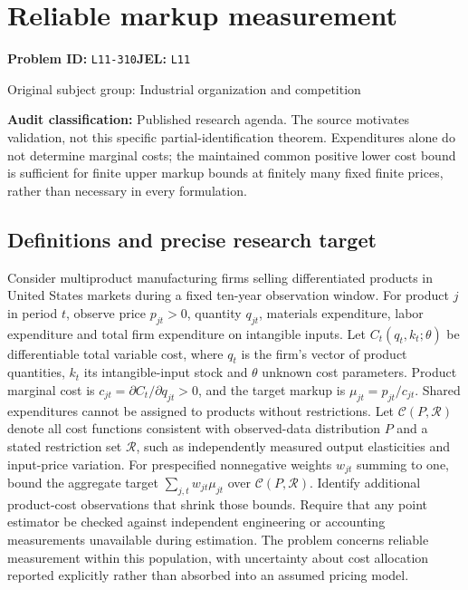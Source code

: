 \documentclass[11pt,a4paper]{article}
\begin{document}
\section*{Reliable markup measurement}
\textbf{Problem ID:} \texttt{L11-310}\quad \textbf{JEL:} \texttt{L11}\par
\label{problem:OP-0391}
\label{audited:ECON-032}
\label{audited:ECON-035}
{\sffamily\small\color{muted}Original subject group: Industrial organization and competition\par}
\label{definitions:problem:30007673}
\textbf{Audit classification:} Published research agenda. The source motivates validation, not this specific partial-identification theorem. Expenditures alone do not determine marginal costs; the maintained common positive lower cost bound is sufficient for finite upper markup bounds at finitely many fixed finite prices, rather than necessary in every formulation.
\subsection*{Definitions and precise research target}
Consider multiproduct manufacturing firms selling differentiated products in United States markets during a fixed ten-year observation window. For product \(j\) in period \(t\), observe price \(p_{jt}>0\), quantity \(q_{jt}\), materials expenditure, labor expenditure and total firm expenditure on intangible inputs. Let \(C_t(q_t,k_t;\theta)\) be differentiable total variable cost, where \(q_t\) is the firm's vector of product quantities, \(k_t\) its intangible-input stock and \(\theta\) unknown cost parameters. Product marginal cost is \(c_{jt}=\partial C_t/\partial q_{jt}>0\), and the target markup is \(\mu_{jt}=p_{jt}/c_{jt}\). Shared expenditures cannot be assigned to products without restrictions. Let \(\mathcal C(P,\mathcal R)\) denote all cost functions consistent with observed-data distribution \(P\) and a stated restriction set \(\mathcal R\), such as independently measured output elasticities and input-price variation. For prespecified nonnegative weights \(w_{jt}\) summing to one, bound the aggregate target \(\sum_{j,t}w_{jt}\mu_{jt}\) over \(\mathcal C(P,\mathcal R)\). Identify additional product-cost observations that shrink those bounds. Require that any point estimator be checked against independent engineering or accounting measurements unavailable during estimation. The problem concerns reliable measurement within this population, with uncertainty about cost allocation reported explicitly rather than absorbed into an assumed pricing model.
\end{document}
